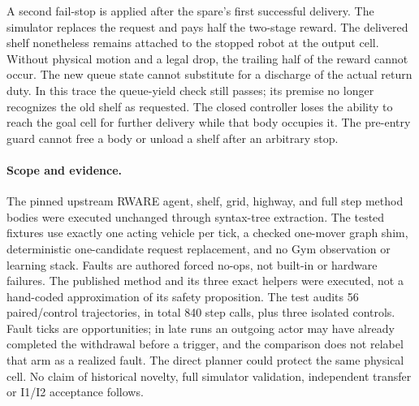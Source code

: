 \documentclass[11pt]{article}
\begin{document}
A second fail-stop is applied after the spare's first successful delivery. The simulator replaces the request and pays half the two-stage reward. The delivered shelf nonetheless remains attached to the stopped robot at the output cell. Without physical motion and a legal drop, the trailing half of the reward cannot occur. The new queue state cannot substitute for a discharge of the actual return duty. In this trace the queue-yield check still passes; its premise no longer recognizes the old shelf as requested. The closed controller loses the ability to reach the goal cell for further delivery while that body occupies it. The pre-entry guard cannot free a body or unload a shelf after an arbitrary stop.

\paragraph{Scope and evidence.}
The pinned upstream RWARE agent, shelf, grid, highway, and full step method bodies were executed unchanged through syntax-tree extraction. The tested fixtures use exactly one acting vehicle per tick, a checked one-mover graph shim, deterministic one-candidate request replacement, and no Gym observation or learning stack. Faults are authored forced no-ops, not built-in or hardware failures. The published method and its three exact helpers were executed, not a hand-coded approximation of its safety proposition. The test audits 56 paired/control trajectories, in total 840 step calls, plus three isolated controls. Fault ticks are opportunities; in late runs an outgoing actor may have already completed the withdrawal before a trigger, and the comparison does not relabel that arm as a realized fault. The direct planner could protect the same physical cell. No claim of historical novelty, full simulator validation, independent transfer or I1/I2 acceptance follows.
\end{document}
